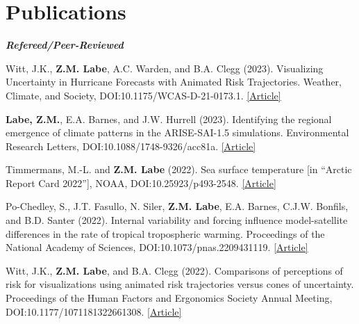 \documentclass[margin,line,palatino,courier,10pt]{res}
\begin{document}
\begin{resume}
\vspace{-0.1in}
\noindent\textcolor{Cerulean}{\makebox[\linewidth][r]{\rule{\textwidth}{5pt}}}
\vspace{-0.3in}

\section{\sc \large{\textcolor{Cerulean}{\textbf{Publications}}}} 
\textit{\textbf{Refereed/Peer-Reviewed}}
\vspace*{-0.1in}\\
\begin{etaremune}[leftmargin=0in,topsep=0in,parsep=0in]
\item Witt, J.K., \textbf{Z.M. Labe}, A.C. Warden, and B.A. Clegg (2023). Visualizing Uncertainty in Hurricane Forecasts with Animated Risk Trajectories. Weather, Climate, and Society, DOI:10.1175/WCAS-D-21-0173.1. \href{https://journals.ametsoc.org/view/journals/wcas/aop/WCAS-D-21-0173.1/WCAS-D-21-0173.1.xml}{[Article]}
\item \textbf{Labe, Z.M.}, E.A. Barnes, and J.W. Hurrell (2023). Identifying the regional emergence of climate patterns in the ARISE-SAI-1.5 simulations. Environmental Research Letters, DOI:10.1088/1748-9326/acc81a. \href{https://iopscience.iop.org/article/10.1088/1748-9326/acc81a}{[Article]}
\item Timmermans, M.-L. and \textbf{Z.M. Labe} (2022). Sea surface temperature [in ``Arctic Report Card 2022''], NOAA, DOI:10.25923/p493-2548. \href{https://arctic.noaa.gov/Report-Card/Report-Card-2022/ArtMID/8054/ArticleID/988/Sea-Surface-Temperature}{[Article]}
\item Po-Chedley, S., J.T. Fasullo, N. Siler, \textbf{Z.M. Labe}, E.A. Barnes, C.J.W. Bonfils, and B.D. Santer (2022). Internal variability and forcing influence model-satellite differences in the rate of tropical tropospheric warming. Proceedings of the National Academy of Sciences, DOI:10.1073/pnas.2209431119. \href{https://www.pnas.org/doi/10.1073/pnas.2209431119}{[Article]}
\item Witt, J.K., \textbf{Z.M. Labe}, and B.A. Clegg (2022). Comparisons of perceptions of risk for visualizations using animated risk trajectories versus cones of uncertainty. Proceedings of the Human Factors and Ergonomics Society Annual Meeting, DOI:10.1177/1071181322661308. \href{https://doi.org/10.1177/1071181322661308}{[Article]}

\end{etaremune}
\end{resume}
\end{document}
